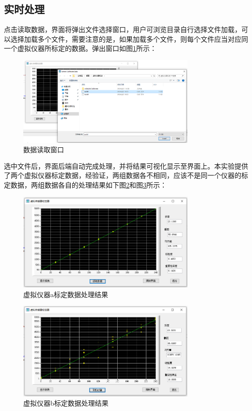 \documentclass[a4paper,12pt,twoside]{article}%
\begin{document}
\subsection{实时处理}
点击读取数据，界面将弹出文件选择窗口，用户可浏览目录自行选择文件加载，可以选择加载多个文件，需要注意的是，如果加载多个文件，则每个文件应当对应同一个虚拟仪器所标定的数据。弹出窗口如图\ref{fig:reader}所示：
\begin{figure}[H]
  \centering
  \includegraphics[width=0.8\textwidth]{数据读取窗口.png}
  \caption{数据读取窗口}
  \label{fig:reader}
\end{figure}
选中文件后，界面后端自动完成处理，并将结果可视化显示至界面上。本实验提供了两个虚拟仪器标定数据，经验证，两组数据各不相同，应该不是同一个仪器的标定数据，两组数据各自的处理结果如下图\ref{fig:a}和图\ref{fig:b}所示：
\begin{figure}[H]
  \centering
  \includegraphics[width=0.8\textwidth]{a.png}
  \caption{虚拟仪器a标定数据处理结果}
  \label{fig:a}
\end{figure}
\begin{figure}[H]
  \centering
  \includegraphics[width=0.8\textwidth]{b.png}
  \caption{虚拟仪器b标定数据处理结果}
  \label{fig:b}
\end{figure}
\end{document}
